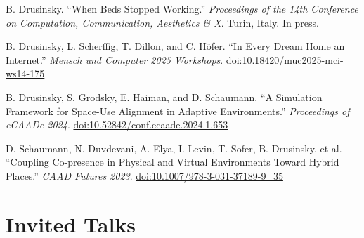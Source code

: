 \documentclass[11pt,letterpaper]{report} %
\begin{document}
\begin{tablist}

\item[2026] \tab{}B. Drusinsky. \enquote{When Beds Stopped Working.} \textit{Proceedings of the 14th Conference on Computation, Communication, Aesthetics \& X}. Turin, Italy. In press.

\item[2025] \tab{}B. Drusinsky, L. Scherffig, T. Dillon, and C. Höfer. \enquote{In Every Dream Home an Internet.} \textit{Mensch und Computer 2025 Workshops}. \href{https://doi.org/10.18420/muc2025-mci-ws14-175}{doi:10.18420/muc2025-mci-ws14-175}

\item[2024] \tab{}B. Drusinsky, S. Grodsky, E. Haiman, and D. Schaumann. \enquote{A Simulation Framework for Space-Use Alignment in Adaptive Environments.} \textit{Proceedings of eCAADe 2024}. \href{https://doi.org/10.52842/conf.ecaade.2024.1.653}{doi:10.52842/conf.ecaade.2024.1.653}

\item[2023] \tab{}D. Schaumann, N. Duvdevani, A. Elya, I. Levin, T. Sofer, B. Drusinsky, et al. \enquote{Coupling Co-presence in Physical and Virtual Environments Toward Hybrid Places.} \textit{CAAD Futures 2023}. \href{https://doi.org/10.1007/978-3-031-37189-9_35}{doi:10.1007/978-3-031-37189-9\_35}

\end{tablist}

\section*{Invited Talks}
\end{document}

